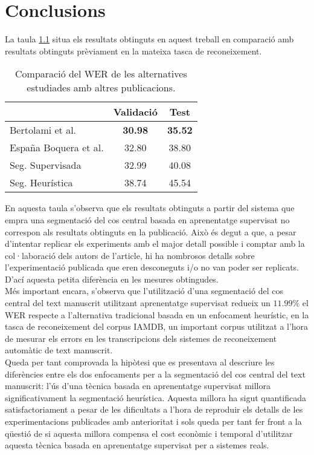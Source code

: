 \chapter{Conclusions}
\label{cap:con}

La taula \ref{tab:summary} situa els resultats obtinguts en aquest treball en comparació amb resultats obtinguts prèviament en la mateixa tasca de reconeixement.\\

\begin{table}
\begin{center}
\begin{tabular}{|l|c|c|}
\hline
& Validació & Test \\\hline\hline
Bertolami et al. \cite{bertolami2008hidden} & \textbf{30.98} & \textbf{35.52} \\\hline
España Boquera et al. \cite{espana2011improving} & 32.80 & 38.80  \\\hline
Seg. Supervisada & 32.99 & 40.08 \\\hline
Seg. Heurística & 38.74 & 45.54 \\\hline
\end{tabular}
\caption{Comparació del WER de les alternatives estudiades amb altres publicacions.}\label{tab:summary}
\end{center}
\end{table}

En aquesta taula s'observa que els resultats obtinguts a partir del sistema que empra una segmentació del cos central basada en aprenentatge supervisat no correspon als resultats obtinguts en la publicació. Això és degut a que, a pesar d'intentar replicar els experiments amb el major detall possible i comptar amb la col·laboració dels autors de l'article, hi ha nombrosos detalls sobre l'ex\-pe\-ri\-men\-ta\-ció publicada que eren desconeguts i/o no van poder ser replicats. D'ací aquesta petita diferència en les mesures obtingudes.\\

Més important encara, s'observa que l'utilització d'una segmentació del cos central del text manuscrit utilitzant aprenentatge supervisat redueix un $11.99\%$ el WER respecte a l'alternativa tradicional basada en un enfocament heurístic, en la tasca de reconeixement del corpus IAMDB, un important corpus utilitzat a l'hora de mesurar els errors en les transcripcions dels sistemes de reconeixement automàtic de text manuscrit.\\

Queda per tant comprovada la hipòtesi que es presentava al descriure les diferències entre els dos enfocaments per a la segmentació del cos central del text manuscrit: l'ús d'una tècnica basada en aprenentatge supervisat millora significativament la segmentació heurística. Aquesta millora ha sigut quantificada satisfactoriament a pesar de les dificultats a l'hora de reproduir els detalls de les experimentacions publicades amb anterioritat i sols queda per tant fer front a la qüestió de si aquesta millora compensa el cost econòmic i temporal d'utilitzar aquesta tècnica basada en aprenentatge supervisat per a sistemes reals.
